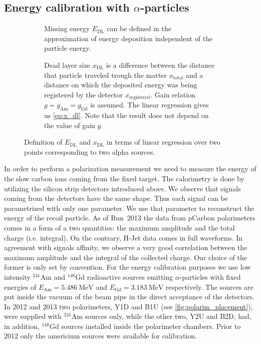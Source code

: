 \documentclass[a4paper,12pt]{article}
\newcommand\americium{${}^{241}$Am}
\newcommand\gadolinium{${}^{148}$Gd}
\begin{document}
\subsection{Energy calibration with $\alpha$-particles}

\begin{figure}[p]
\begin{subfigure}[t]{0.49\textwidth}
 \caption{Missing energy $E_\text{DL}$ can be
defined in the approximation of energy deposition independent of the particle
energy.}
\label{fig:calib_curve_naive}
\end{subfigure}
\hfill
\begin{subfigure}[t]{0.49\textwidth}

\caption{Dead layer size $x_\text{DL}$ is a difference between the distance
that particle traveled trough the matter $x_\text{total}$ and a distance on
which the deposited energy was being registered by the detector
$x_\text{registered}$.  Gain relation $g=g_\text{Am}=g_\text{Gd}$ is assumed.
The linear regression gives us \cref{eq:x_dl}.  Note that the result does not
depend on the value of gain $g$.}
\label{fig:calib_curve_smart}
\end{subfigure}
\caption{Definition of $E_\text{DL}$ and $x_\text{DL}$ in terms of linear regression
over two points corresponding to two alpha sources.}
\label{fig:calib_curves}
\end{figure}

In order to perform a polarization measurement we need to measure the energy of
the slow carbon ions coming from the fixed target. The calorimetry is done by
utilizing the silicon strip detectors introduced above.  We observe that
signals coming from the detectors have the same shape.  Thus each signal can be
parametrized with only one parameter.  We use that parameter to reconstruct the
energy of the recoil particle.  As of Run~2013 the data from pCarbon
polarimeters comes in a form of a two quantities: the maximum amplitude and the
total charge (i.e. integral). On the contrary, H-Jet data comes in full
waveforms. In agreement with signals affinity, we observe a very good correlation
between the maximum amplitude and the integral of the collected charge. Our
choice of the former is only set by convention.
For the energy calibration purposes we use low intensity \americium{} and \gadolinium{} radioactive
sources emitting $\alpha$-particles with fixed energies of $E_{\text{Am}} =
5.486~\text{MeV}$ and $E_{\text{Gd}} = 3.183~\text{MeV}$\cite{rytz} respectively. The
sources are put inside the vacuum of the beam pipe in the direct acceptance of the detectors. In
2012 and 2013 two polarimeters, Y1D and B1U (see \cref{fig:polarim_placement}), were supplied with \americium{}
sources only, while the other two, Y2U and B2D, had, in addition, \gadolinium{}
sources installed inside the polarimeter chambers. Prior to 2012 only the
americium sources were available for calibration.
\end{document}
